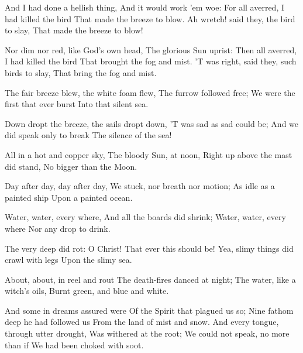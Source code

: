 \documentclass{book}
\newcommand{\strophaVI}{%
  \Forma \strophae {0{\penalty 10000}0000{\penalty 10000}0}}
\begin{document}
%
{\strophaVI
   And I had done a hellish thing,
  And it would work 'em woe:
  For all averred, I had killed the bird
  That made the breeze to blow.
  Ah wretch! said they, the bird to slay,                             
  That made the breeze to blow!

%
  Nor dim nor red, like God's own head,
  The glorious Sun uprist:
  Then all averred, I had killed the bird
  That brought the fog and mist.                                     
  'T was right, said they, such birds to slay,
  That bring the fog and mist.
}
%
  The fair breeze blew, the white foam flew,
  The furrow followed free;
  We were the first that ever burst                                  
  Into that silent sea.

  Down dropt the breeze, the sails dropt down,
  'T was sad as sad could be;
%
  And we did speak only to break
  The silence of the sea!                                            

  All in a hot and copper sky,
  The bloody Sun, at noon,
  Right up above the mast did stand,
  No bigger than the Moon.

  Day after day, day after day,                                      
  We stuck, nor breath nor motion;
  As idle as a painted ship
  Upon a painted ocean.

%
  Water, water, every where,
  And all the boards did shrink;                                     
  Water, water, every where
  Nor any drop to drink.

  The very deep did rot: O Christ!
  That ever this should be!
  Yea, slimy things did crawl with legs                              
  Upon the slimy sea.

  About, about, in reel and rout
  The death-fires danced at night;
  The water, like a witch's oils,
  Burnt green, and blue and white. 

\area 
  And some in dreams assured were
  Of the Spirit that plagued us so;
  Nine fathom deep he had followed us
  From the land of mist and snow.
\endarea
  And every tongue, through utter drought,                           
  Was withered at the root;
  We could not speak, no more than if
  We had been choked with soot.
\end{document}
